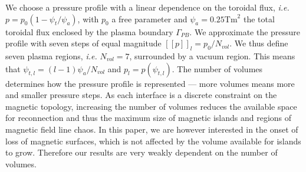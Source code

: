 \documentclass[my_thesis.tex]{subfiles}
\begin{document}
We choose a pressure profile with a linear dependence on the toroidal flux, \textit{i.e.} $p=p_0(1-\psi_t/\psi_a)$, with $p_0$ a free parameter and $\psi_a=0.25\text{Tm}^2$ the total toroidal flux enclosed by the plasma boundary $\Gamma_{PB}$. We approximate the pressure profile with seven steps of equal magnitude $[[p]]_l=p_0/N_{vol}$. We thus define seven plasma regions, \textit{i.e.} $N_{vol}=7$, surrounded by a vacuum region. This means that $\psi_{t,l}=(l-1)\psi_a / N_{vol}$ and $p_l=p(\psi_{t,l})$. The number of volumes determines how the pressure profile is represented --- more volumes means more and smaller pressure steps. As each interface is a discrete constraint on the magnetic topology, increasing the number of volumes reduces the available space for reconnection and thus the maximum size of magnetic islands and regions of magnetic field line chaos.  In this paper, we are however interested in the onset of loss of magnetic surfaces, which is not affected by the volume available for islands to grow. Therefore our results are very weakly dependent on the number of volumes.




\end{document}
